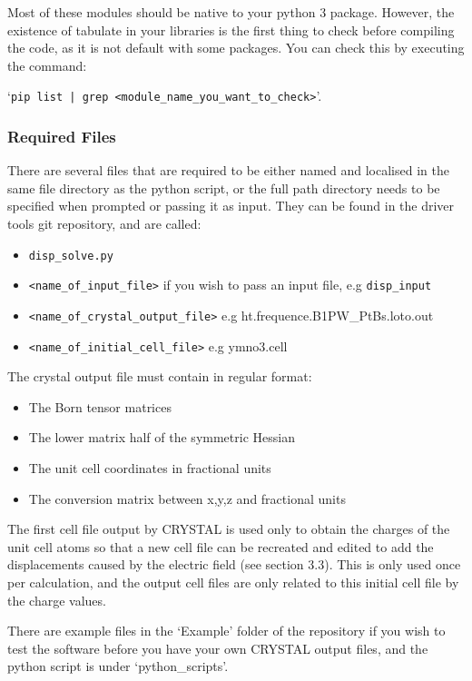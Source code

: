\documentclass[10pt]{article}
\begin{document}
Most of these modules should be native to your python 3 package. However, the existence of tabulate in your libraries is the first thing to check before compiling the code, as it is not default with some packages. You can check this by executing the command:

`\texttt{pip list | grep <module\_name\_you\_want\_to\_check>}'.

\subsubsection{Required Files}
There are several files that are required to be either named and localised in the same file directory as the python script, or the full path directory needs to be specified when prompted or passing it as input. They can be found in the driver tools git repository, and are called:

\begin{itemize}
	\item \texttt{disp\_solve.py}
	\item \texttt{<name\_of\_input\_file>} if you wish to pass an input file, e.g \texttt{disp\_input}
	\item \texttt{<name\_of\_crystal\_output\_file>} e.g ht.frequence.B1PW\_PtBs.loto.out
	\item \texttt{<name\_of\_initial\_cell\_file>} e.g ymno3.cell
\end{itemize}

The crystal output file must contain in regular format:

\begin{itemize}
	\item The Born tensor matrices
	\item The lower matrix half of the symmetric Hessian
	\item The unit cell coordinates in fractional units
	\item The conversion matrix between x,y,z and fractional units
\end{itemize}

The first cell file output by CRYSTAL is used only to obtain the charges of the unit cell atoms so that a new cell file can be recreated and edited to add the displacements caused by the electric field (see section 3.3). This is only used once per calculation, and the output cell files are only related to this initial cell file by the charge values.

There are example files in the `Example' folder of the repository if you wish to test the software before you have your own CRYSTAL output files, and the python script is under `python\_scripts'.
\end{document}
